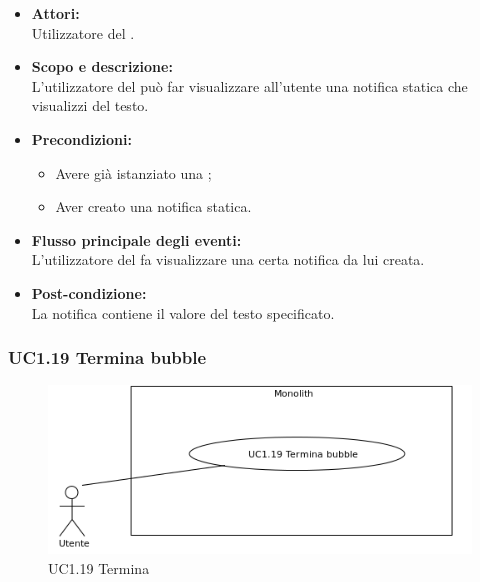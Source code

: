 \begin{itemize}
	\item \textbf{Attori:}
	\\Utilizzatore del .
	\item \textbf{Scopo e descrizione:} 
	\\L'utilizzatore del  può far visualizzare all'utente una notifica statica che visualizzi del testo.
	\item \textbf{Precondizioni:}
	\begin{itemize}
		\item Avere già istanziato una ;
		\item Aver creato una notifica statica.
	\end{itemize}
	\item \textbf{Flusso principale degli eventi:}
	\\L'utilizzatore del  fa visualizzare una certa notifica da lui creata.
	\item \textbf{Post-condizione:}
	\\La notifica contiene il valore del testo specificato.
\end{itemize}

\subsubsection{UC1.19 Termina bubble} \label{UC1.19}

\begin{figure}[H]
	\centering
	\includegraphics[width=15cm]{../../documenti/AnalisiDeiRequisiti/Diagrammi_img/uc1_19.png}
	\caption{UC1.19 Termina }
\end{figure}

